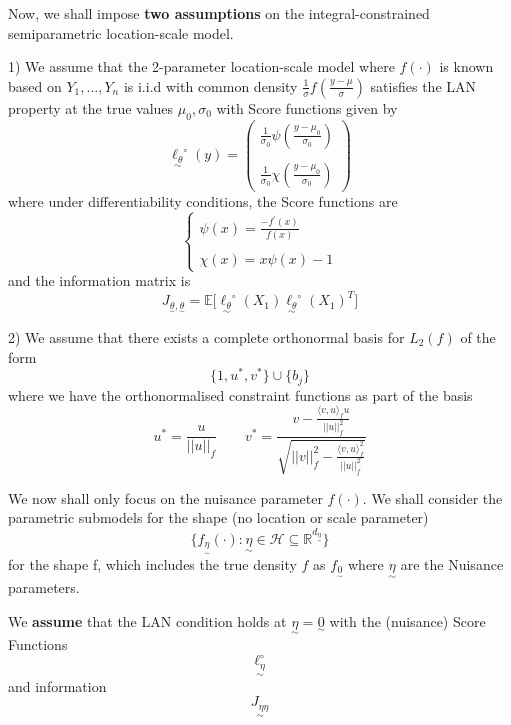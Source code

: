 \documentclass[twoside]{article}
\newcommand{\real}{\mathbb{R}}
\newcommand{\utilde}{\underset{\sim}}
\begin{document}
Now, we shall impose \textbf{two assumptions} on the integral-constrained semiparametric location-scale model.

1) We assume that the 2-parameter location-scale model where $f(\cdot)$ is known based on $Y_1, ..., Y_n$ is i.i.d with common density $\frac{1}{\sigma}f(\frac{y - \mu}{\sigma})$ satisfies the LAN property at the true values $\mu_0, \sigma_0$ with Score functions given by 
\begin{equation}
\utilde{\ell_{\theta}}^{\circ}(y) = 
\begin{pmatrix}
\frac{1}{\sigma_0}\psi(\frac{y - \mu_0}{\sigma_0})\\\\
\frac{1}{\sigma_0}\chi(\frac{y - \mu_0}{\sigma_0})
\end{pmatrix}
\end{equation}
where under differentiability conditions, the Score functions are
$$
\begin{cases}
\psi(x) = \frac{-f^{'}(x)}{f(x)}\\\\
\chi(x) = x\psi(x) - 1
\end{cases}
$$
and the information matrix is
\begin{equation}
J_{\utilde{\theta}, \utilde{\theta}} = \mathbb{E}\big[\utilde{\ell_{\theta}}^{\circ}(X_1)\utilde{\ell_{\theta}}^{\circ}(X_1)^T \big]
\end{equation}

2) We assume that there exists a complete orthonormal basis for $L_2(f)$ of the form 
$$
\{1, u^{*}, v^{*}\} \cup \{b_j\}
$$
where we have the orthonormalised constraint functions as part of the basis
\begin{equation}
u^* = \frac{u}{||u||_{f}} \quad \quad v^* = \frac{v - \frac{\langle v, u \rangle_f u}{||u||_{f}^{2}}}{\sqrt{||v||_{f}^{2} - \frac{\langle v, u \rangle_{f}^{2}}{||u||_{f}^{2}}}}
\end{equation}

We now shall only focus on the nuisance parameter $f(\cdot).$ We shall consider the parametric submodels for the shape (no location or scale parameter)
$$
\{f_{\utilde{\eta}}(\cdot): \utilde{\eta} \in \mathcal{H} \subseteq \real^{d_{\utilde{\eta}}} \}
$$
for the shape f, which includes the true density $f$ as $f_{\utilde{0}}$ where $\utilde{\eta}$ are the Nuisance parameters.

We \textbf{assume} that the LAN condition holds at $\utilde{\eta} = \utilde{0}$ with the (nuisance) Score Functions 
$$
\utilde{\ell_{\eta}^{\circ}}
$$
and information 
$$
\utilde{J_{\eta \eta}}
$$
\end{document}

